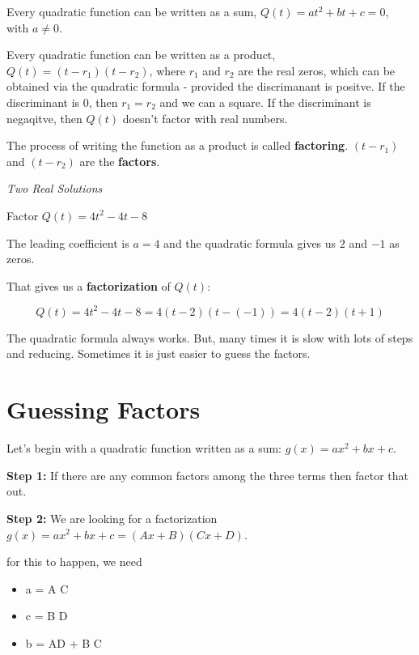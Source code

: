 \documentclass{ximera}
\begin{document}
Every quadratic function can be written as a sum, $Q(t) = a t^2 + b t + c = 0$, with $a \ne 0$.

Every quadratic function can be written as a product, $Q(t) = (t - r_1)(t - r_2)$, where $r_1$ and $r_2$ are the real zeros, which can be obtained via the quadratic formula - provided the discrimanant is positve.  If the discriminant is $0$, then $r_1 = r_2$ and we can a square.  If the discriminant is negaqitve, then $Q(t)$ doesn't factor with real numbers.  


The process of writing the function as a product is called \textbf{factoring}. $(t - r_1)$  and $(t - r_2)$ are the \textbf{factors}.



\begin{example} \textit{Two Real Solutions} 

Factor $Q(t) = 4 t^2 - 4 t - 8$ 

The leading coefficient is $a=4$ and the quadratic formula gives us $2$ and $-1$ as zeros.  

That gives us a \textbf{factorization} of $Q(t)$:



\[    Q(t) = 4 t^2 - 4 t - 8 =  4 (t-2)(t-(-1))    = 4 (t-2)(t+1)         \]



\end{example}



The quadratic formula always works.  But, many times it is slow with lots of steps and reducing.  Sometimes it is just easier to guess the factors.



\section{Guessing Factors}


Let's begin with a quadratic function written as a sum: $g(x) = a x^2 + b x + c$.  


\textbf{Step 1:} If there are any common factors among the three terms then factor that out.


\textbf{Step 2:} We are looking for a factorization $g(x) = a x^2 + b x + c = (A x + B)(C x + D)$.

for this to happen, we need

\begin{itemize}
\item a = A \cdot C 
\item c = B \cdot D
\item b = A\cdot D + B \cdot C
\end{itemize}
\end{document}
